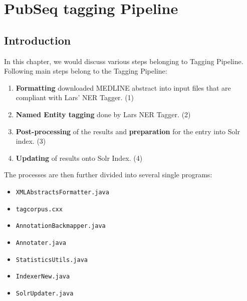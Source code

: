 
\chapter{PubSeq tagging Pipeline} %

\label{Chapter4} %



\section{Introduction}

In this chapter, we would discuss various steps belonging to Tagging Pipeline. Following main steps belong to the Tagging Pipeline:

\begin{enumerate}
\item \textbf{Formatting} downloaded MEDLINE abstract into input files that are compliant with Lars' NER Tagger. \label{itm:TaggingStep1} (1)
\item \textbf{Named Entity tagging} done by Lars NER Tagger. \label{itm:TaggingStep2} (2)
\item \textbf{Post-processing} of the results and \textbf{preparation} for the entry into Solr index. \label{itm:TaggingStep3} (3)
\item \textbf{Updating} of results onto Solr Index. \label{itm:TaggingStep4} (4)
\end{enumerate}

The processes are then further divided into several single programs:

\begin{itemize}
\item \texttt{XMLAbstractsFormatter.java}
\item \texttt{tagcorpus.cxx}
\item \texttt{AnnotationBackmapper.java}
\item \texttt{Annotater.java}
\item \texttt{StatisticsUtils.java}
\item \texttt{IndexerNew.java}
\item \texttt{SolrUpdater.java}
\end{itemize}

